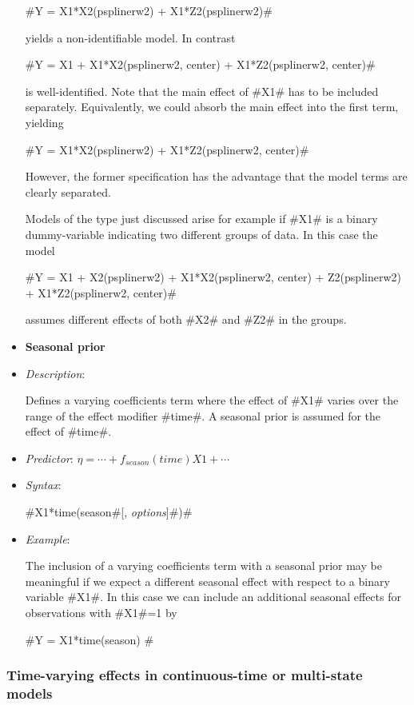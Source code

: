 \begin{itemize}
#Y = X1*X2(psplinerw2) + X1*Z2(psplinerw2)#

yields a non-identifiable model. In contrast

#Y = X1 + X1*X2(psplinerw2, center) + X1*Z2(psplinerw2, center)#

is well-identified. Note that the main effect of #X1# has to be
included separately. Equivalently, we could absorb the main effect
into the first term, yielding

#Y = X1*X2(psplinerw2) + X1*Z2(psplinerw2, center)#

However, the former specification has the advantage that the model
terms are clearly separated.

Models of the type just discussed arise for example if #X1# is a
binary dummy-variable indicating two different groups of data. In
this case the model

 #Y = X1 + X2(psplinerw2) + X1*X2(psplinerw2, center) + Z2(psplinerw2) + X1*Z2(psplinerw2, center)#

assumes different effects of both #X2# and #Z2# in the groups.

\item[]{\bf\sffamily Seasonal prior}

\item[] {\em Description}:

Defines a varying coefficients term where the effect of #X1#
varies over the range of the effect modifier #time#. A seasonal
prior is assumed for the effect of #time#.

\item[] {\em Predictor}: $\eta= \cdots + f_{season}(time)X1 +
\cdots $ \item[] {\em Syntax}:

#X1*time(season#[, {\em options}]#)#
\item[] {\em Example}:

The inclusion of a varying coefficients term with a seasonal prior
may be meaningful if we expect a different seasonal effect with
respect to a binary variable #X1#. In this case we can include an
additional seasonal effects for observations with #X1#=1 by

#Y = X1*time(season) #

\end{itemize}

\subsubsection*{Time-varying effects in continuous-time or multi-state models}


